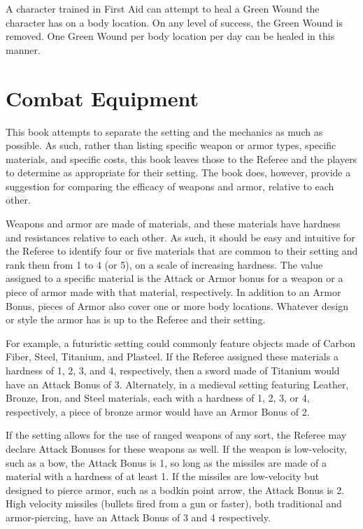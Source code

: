 \documentclass[oneside]{book}
\begin{document}
\begin{multicols}{2}
A character trained in First Aid can attempt to heal a Green Wound the character has on a body location. On any level of success, the Green Wound is removed. One Green Wound per body location per day can be healed in this manner.

\section{Combat Equipment}
This book attempts to separate the setting and the mechanics as much as possible. As such, rather than listing specific weapon or armor types, specific materials, and specific costs, this book leaves those to the Referee and the players to determine as appropriate for their setting. The book does, however, provide a suggestion for comparing the efficacy of weapons and armor, relative to each other. 

Weapons and armor are made of materials, and these materials have hardness and resistances relative to each other. As such, it should be easy and intuitive for the Referee to identify four or five materials that are common to their setting and rank them from 1 to 4 (or 5), on a scale of increasing hardness. The value assigned to a specific material is the Attack or Armor bonus for a weapon or a piece of armor made with that material, respectively. In addition to an Armor Bonus, pieces of Armor also cover one or more body locations. Whatever design or style the armor has is up to the Referee and their setting. 

For example, a futuristic setting could commonly feature objects made of Carbon Fiber, Steel, Titanium, and Plasteel. If the Referee assigned these materials a hardness of 1, 2, 3, and 4, respectively, then a sword made of Titanium would have an Attack Bonus of 3. Alternately, in a medieval setting featuring Leather, Bronze, Iron, and Steel materials, each with a hardness of 1, 2, 3, or 4, respectively, a piece of bronze armor would have an Armor Bonus of 2. 

If the setting allows for the use of ranged weapons of any sort, the Referee may declare Attack Bonuses for these weapons as well. If the weapon is low-velocity, such as a bow, the Attack Bonus is 1, so long as the missiles are made of a material with a hardness of at least 1. If the missiles are low-velocity but designed to pierce armor, such as a bodkin point arrow, the Attack Bonus is 2. High velocity missiles (bullets fired from a gun or faster), both traditional and armor-piercing, have an Attack Bonus of 3 and 4 respectively. 


\end{multicols}
\end{document}
